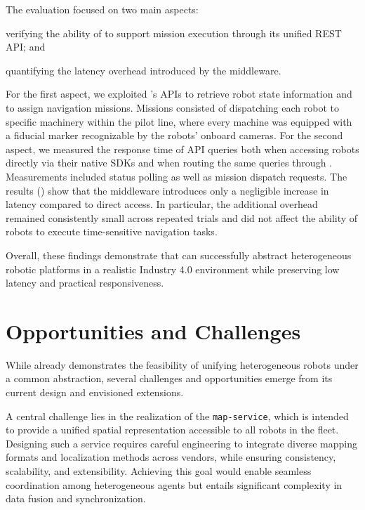 \documentclass[conference]{IEEEtran}
\begin{document}
The evaluation focused on two main aspects: 
\begin{enumerate*}[label=(\roman*)]
    \item verifying the ability of \approach{} to support mission execution through its unified REST API; and 
    \item quantifying the latency overhead introduced by the middleware. 
\end{enumerate*}
% 
For the first aspect, 
 we exploited \approach{}'s APIs to retrieve robot state information and to assign navigation missions. 
% 
Missions consisted of dispatching each robot to specific machinery within the pilot line, 
 where every machine was equipped with a fiducial marker recognizable by the robots' onboard cameras. 
%
For the second aspect, 
 we measured the response time of API queries both when accessing robots directly via their native SDKs 
 and when routing the same queries through \approach{}. 
%  
Measurements included status polling as well as mission dispatch requests. 
%
The results () show that the middleware introduces only a negligible increase in latency compared to direct access. 
%
In particular, 
 the additional overhead remained consistently small across repeated trials 
 and did not affect the ability of robots to execute time-sensitive navigation tasks.

Overall, 
 these findings demonstrate that \approach{} can successfully abstract heterogeneous robotic platforms 
 in a realistic Industry 4.0 environment while preserving low latency and practical responsiveness. 

\section{Opportunities and Challenges}\label{sec:impact}

While \approach{} already demonstrates the feasibility of unifying 
 heterogeneous robots under a common abstraction, 
 several challenges and opportunities emerge from its current design and envisioned extensions.

A central challenge lies in the realization of the \texttt{map-service}, 
 which is intended to provide a unified spatial representation accessible to all robots in the fleet. 
% 
Designing such a service requires careful engineering to integrate diverse mapping formats 
 and localization methods across vendors, while ensuring consistency, scalability, and extensibility. 
% 
Achieving this goal would enable seamless coordination among heterogeneous agents 
 but entails significant complexity in data fusion and synchronization.
\end{document}

